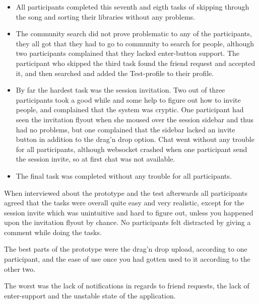 \begin{itemize}
	\item All participants completed this seventh and eigth tasks of skipping through the song and sorting their libraries without any problems.
	\item The community search did not prove problematic to any of the participants, they all got that they had to go to community to search for people, although two participants complained that they lacked enter-button support. The participant who skipped the third task found the friend request and accepted it, and then searched and added the Test-profile to their profile.
	\item By far the hardest task was the session invitation. Two out of three participants took a good while and some help to figure out how to invite people, and complained that the system was cryptic. One participant had seen the invitation flyout when she moused over the session sidebar and thus had no problems, but one complained that the sidebar lacked an invite button in addition to the drag'n drop option. Chat went without any trouble for all participants, although websocket crashed when one participant send the session invite, so at first chat was not available.
	\item The final task was completed without any trouble for all participants.
\end{itemize}

When interviewed about the prototype and the test afterwards all participants agreed that the tasks were overall quite easy and very realistic, except for the session invite which was unintuitive and hard to figure out, unless you happened upon the invitation flyout by chance. No participants felt distracted by giving a comment while doing the tasks. 

The best parts of the prototype were the drag'n drop upload, according to one participant, and the ease of use once you had gotten used to it according to the other two. 

The worst was the lack of notifications in regards to friend requests, the lack of enter-support and the unstable state of the application.